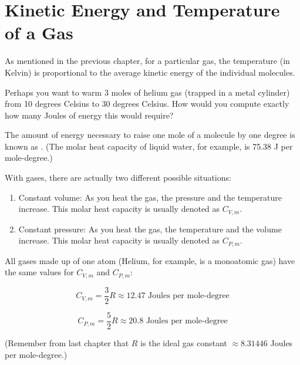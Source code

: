 \chapter{Kinetic Energy and Temperature of a Gas}

As mentioned in the previous chapter, for a particular gas, the temperature (in Kelvin) is proportional to the average kinetic energy of the individual molecules. 

Perhaps you want to warm 3 moles of helium gas (trapped in a metal cylinder) from 10 degrees Celsius to 30 degrees Celsius.  
How would you compute exactly how many Joules of energy this would require?

The amount of energy necessary to raise one mole of a molecule by one degree is known as . 
(The molar heat capacity of liquid water, for example, is 75.38 J per mole-degree.)

With gases, there are actually two different possible situations:
\begin{enumerate}
\item Constant volume: As you heat the gas, the pressure and the temperature increase. This molar heat capacity is usually denoted as $C_{V,m}$. 
\item Constant pressure: As you heat the gas, the temperature and the volume increase. This molar heat capacity is usually denoted as $C_{P, m}$.
\end{enumerate}

All gases made up of one atom (Helium, for example, is a monoatomic gas) have the same values for $C_{V,m}$ and $C_{P,m}$:

$$C_{V,m} = \frac{3}{2}R \approx 12.47 \text{ Joules per mole-degree}$$

$$C_{P,m} = \frac{5}{2}R \approx 20.8 \text{ Joules per mole-degree}$$

(Remember from last chapter that $R$ is the ideal gas constant $\approx 8.31446$ Joules per mole-degree.)

